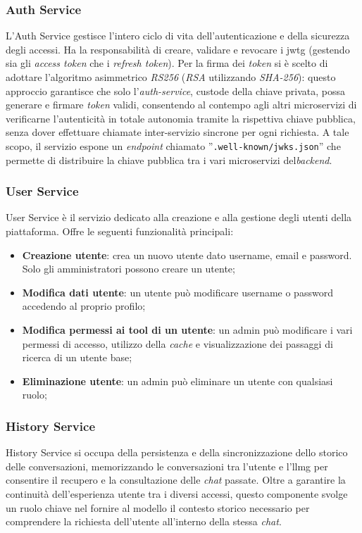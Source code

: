 \subsubsection{Auth Service}
L'Auth Service gestisce l'intero ciclo di vita dell'autenticazione 
e della sicurezza degli accessi. 
Ha la responsabilità di creare, validare e revocare i \gls{jwtg} 
(gestendo sia gli \textit{access token} che i \textit{refresh token}). 
Per la firma dei \textit{token} si è scelto di adottare l'algoritmo asimmetrico 
\textit{RS256} (\textit{RSA} utilizzando \textit{SHA-256}): 
questo approccio garantisce che solo l'\textit{auth-service}, custode 
della chiave privata, possa generare e firmare \textit{token} validi, 
consentendo al contempo agli altri microservizi di verificarne l'autenticità 
in totale autonomia tramite la rispettiva chiave pubblica, senza dover 
effettuare chiamate inter-servizio sincrone per ogni richiesta. 
A tale scopo, il servizio espone un \textit{endpoint} chiamato 
''\texttt{.well-known/jwks.json}'' che permette di distribuire la chiave pubblica 
tra i vari microservizi del\textit{backend}.

\subsubsection{User Service}
User Service è il servizio dedicato alla creazione e alla gestione degli 
utenti della piattaforma. Offre le seguenti funzionalità principali:
\begin{itemize}
    \item \textbf{Creazione utente}: crea un nuovo utente dato username, email e 
    password. Solo gli amministratori possono creare un utente;
    \item \textbf{Modifica dati utente}: un utente può modificare 
    username o password accedendo al proprio profilo;
    \item \textbf{Modifica permessi ai tool di un utente}: un admin può 
    modificare i vari permessi di accesso, utilizzo della \textit{cache} e 
    visualizzazione dei passaggi di ricerca di un utente base;
    \item \textbf{Eliminazione utente}: un admin può eliminare un utente 
    con qualsiasi ruolo;
\end{itemize}


\subsubsection{History Service}
History Service si occupa della persistenza e della sincronizzazione dello storico 
delle conversazioni, memorizzando le conversazioni tra l'utente e l'\gls{llmg} 
per consentire il recupero e la consultazione delle \textit{chat} passate. 
Oltre a garantire la continuità dell'esperienza utente tra i diversi accessi, 
questo componente svolge un ruolo chiave nel fornire al modello il contesto 
storico necessario per comprendere la richiesta dell'utente all'interno della 
stessa \textit{chat}.


